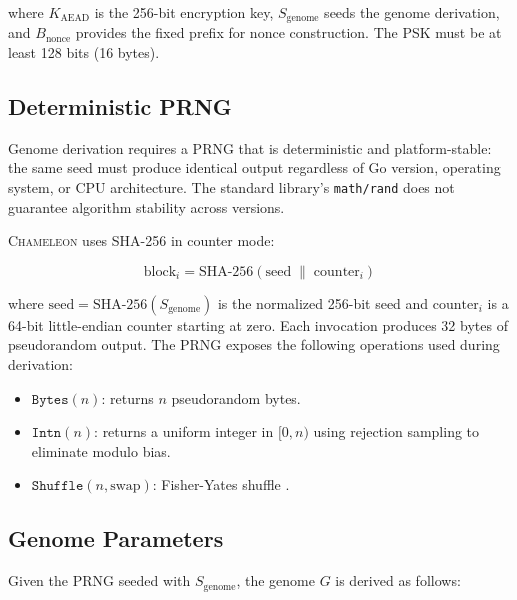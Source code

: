 \documentclass[11pt,a4paper]{article}
\newcommand{\chameleon}{\textsc{Chameleon}}
\begin{document}
where $K_{\text{AEAD}}$ is the 256-bit encryption key, $S_{\text{genome}}$ seeds the genome derivation, and $B_{\text{nonce}}$ provides the fixed prefix for nonce construction. The PSK must be at least 128 bits (16 bytes).

\subsection{Deterministic PRNG}\label{sec:prng}

Genome derivation requires a PRNG that is deterministic and platform-stable: the same seed must produce identical output regardless of Go version, operating system, or CPU architecture. The standard library's \texttt{math/rand} does not guarantee algorithm stability across versions.

\chameleon{} uses SHA-256 in counter mode:

\begin{equation}
  \text{block}_i = \text{SHA-256}(\text{seed} \;\|\; \text{counter}_i)
\end{equation}

where $\text{seed} = \text{SHA-256}(S_{\text{genome}})$ is the normalized 256-bit seed and $\text{counter}_i$ is a 64-bit little-endian counter starting at zero. Each invocation produces 32 bytes of pseudorandom output. The PRNG exposes the following operations used during derivation:

\begin{itemize}[nosep]
  \item $\texttt{Bytes}(n)$: returns $n$ pseudorandom bytes.
  \item $\texttt{Intn}(n)$: returns a uniform integer in $[0, n)$ using rejection sampling to eliminate modulo bias.
  \item $\texttt{Shuffle}(n, \text{swap})$: Fisher-Yates shuffle \cite{fisher1938statistical}.
\end{itemize}

\subsection{Genome Parameters}\label{sec:genome_params}

Given the PRNG seeded with $S_{\text{genome}}$, the genome $G$ is derived as follows:
\end{document}
